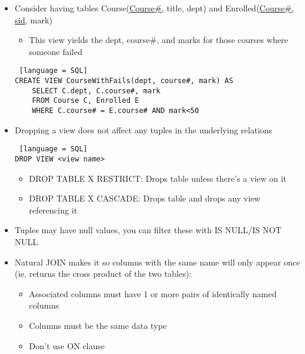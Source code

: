 \documentclass[8pt,landscape,a4paper, fleqn, dvipsnames]{extarticle}
\begin{document}
\begin{multicols*}{4}
\begin{itemize}
    \begin{itemize}
        \item They can be used to present necessary info, while hiding details in underlying relations
        \item View updates must occur at base tables
    \end{itemize}
    \begin{lstlisting} [language = SQL]
Create View <view name> <attributes in view> AS <view definition>
    \end{lstlisting}
    \item Consider having tables Course(\ul{Course\#}, title, dept) and Enrolled(\ul{Course\#, sid}, mark)
    \begin{itemize}
        \item This view yields the dept, course\#, and marks for those courses where someone failed
    \end{itemize}
    \begin{lstlisting} [language = SQL]
CREATE VIEW CourseWithFails(dept, course#, mark) AS
    SELECT C.dept, C.course#, mark
    FROM Course C, Enrolled E
    WHERE C.course# = E.course# AND mark<50
    \end{lstlisting}
    \item Dropping a view does not affect any tuples in the underlying relations
    \begin{lstlisting} [language = SQL]
DROP VIEW <view name>
    \end{lstlisting}
    \begin{itemize}
        \item DROP TABLE X RESTRICT: Drops table unless there's a view on it
        \item DROP TABLE X CASCADE: Drops table and drops any view referencing it
    \end{itemize}
    \item Tuples may have null values, you can filter these with IS NULL/IS NOT NULL
    \item Natural JOIN makes it so columns with the same name will only appear once (ie. returns the cross product of the two tables):
    \begin{itemize}
        \item Associated columns must have 1 or more pairs of identically named columns
        \item Columns must be the same data type
        \item Don't use ON clause
    \end{itemize}

\end{itemize}
\end{multicols*}
\end{document}
